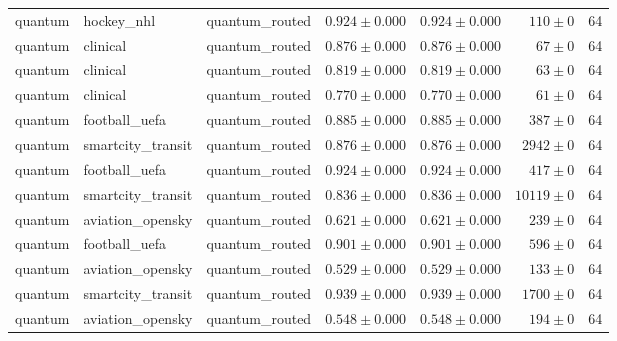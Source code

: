 \begin{table}[htbp]
\begin{tabular}{l l l r r r r}
quantum & hockey\_nhl & quantum\_routed & $0.924\pm0.000$ & $0.924\pm0.000$ & $110\pm0$ & 64 \\
quantum & clinical & quantum\_routed & $0.876\pm0.000$ & $0.876\pm0.000$ & $67\pm0$ & 64 \\
quantum & clinical & quantum\_routed & $0.819\pm0.000$ & $0.819\pm0.000$ & $63\pm0$ & 64 \\
quantum & clinical & quantum\_routed & $0.770\pm0.000$ & $0.770\pm0.000$ & $61\pm0$ & 64 \\
quantum & football\_uefa & quantum\_routed & $0.885\pm0.000$ & $0.885\pm0.000$ & $387\pm0$ & 64 \\
quantum & smartcity\_transit & quantum\_routed & $0.876\pm0.000$ & $0.876\pm0.000$ & $2942\pm0$ & 64 \\
quantum & football\_uefa & quantum\_routed & $0.924\pm0.000$ & $0.924\pm0.000$ & $417\pm0$ & 64 \\
quantum & smartcity\_transit & quantum\_routed & $0.836\pm0.000$ & $0.836\pm0.000$ & $10119\pm0$ & 64 \\
quantum & aviation\_opensky & quantum\_routed & $0.621\pm0.000$ & $0.621\pm0.000$ & $239\pm0$ & 64 \\
quantum & football\_uefa & quantum\_routed & $0.901\pm0.000$ & $0.901\pm0.000$ & $596\pm0$ & 64 \\
quantum & aviation\_opensky & quantum\_routed & $0.529\pm0.000$ & $0.529\pm0.000$ & $133\pm0$ & 64 \\
quantum & smartcity\_transit & quantum\_routed & $0.939\pm0.000$ & $0.939\pm0.000$ & $1700\pm0$ & 64 \\
quantum & aviation\_opensky & quantum\_routed & $0.548\pm0.000$ & $0.548\pm0.000$ & $194\pm0$ & 64 \\
\hline
\end{tabular}
\end{table}
